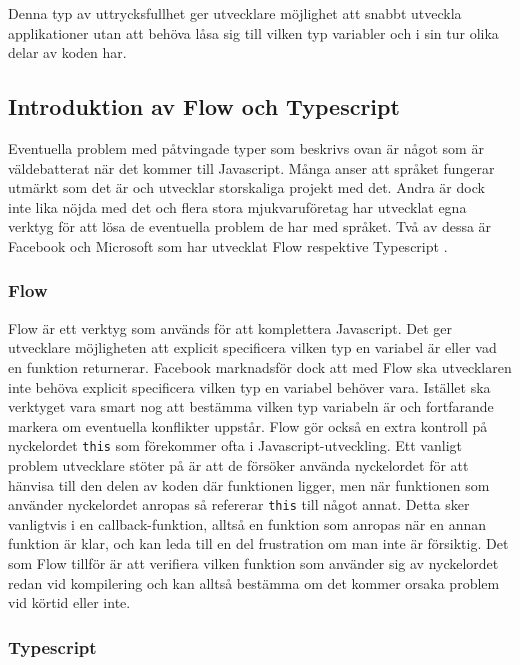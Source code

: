 Denna typ av uttrycksfullhet ger utvecklare möjlighet att snabbt utveckla applikationer utan att behöva låsa sig till vilken typ variabler och i sin tur olika delar av koden har.


\subsection{Introduktion av Flow och Typescript}

Eventuella problem med påtvingade typer som beskrivs ovan är något som är väldebatterat när det kommer till Javascript. Många anser att språket fungerar utmärkt som det är och utvecklar storskaliga projekt med det. Andra är dock inte lika nöjda med det och flera stora mjukvaruföretag har utvecklat egna verktyg för att lösa de eventuella problem de har med språket.\cite{js-bad} Två av dessa är Facebook och Microsoft som har utvecklat Flow \cite{info-flow} respektive Typescript \cite{typescript}.

\subsubsection{Flow}

Flow är ett verktyg som används för att komplettera Javascript. Det ger utvecklare möjligheten att explicit specificera vilken typ en variabel är eller vad en funktion returnerar. Facebook marknadsför dock att med Flow ska utvecklaren inte behöva explicit specificera vilken typ en variabel behöver vara. Istället ska verktyget vara smart nog att bestämma vilken typ variabeln är och fortfarande markera om eventuella konflikter uppstår. Flow gör också en extra kontroll på nyckelordet \texttt{this} som förekommer ofta i Javascript-utveckling. Ett vanligt problem utvecklare stöter på är att de försöker använda nyckelordet för att hänvisa till den delen av koden där funktionen ligger, men när funktionen som använder nyckelordet anropas så refererar \texttt{this} till något annat. Detta sker vanligtvis i en callback-funktion, alltså en funktion som anropas när en annan funktion är klar, och kan leda till en del frustration om man inte är försiktig. Det som Flow tillför är att verifiera vilken funktion som använder sig av nyckelordet redan vid kompilering och kan alltså bestämma om det kommer orsaka problem vid körtid eller inte. 

\subsubsection{Typescript}

